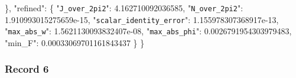 \documentclass[
  10pt,
]{article}
\newenvironment{Shaded}{}{}
\newcommand{\DataTypeTok}[1]{\textcolor[rgb]{0.56,0.13,0.00}{#1}}
\newcommand{\FloatTok}[1]{\textcolor[rgb]{0.25,0.63,0.44}{#1}}
\newcommand{\FunctionTok}[1]{\textcolor[rgb]{0.02,0.16,0.49}{#1}}
\begin{document}
\begin{Shaded}
\begin{Highlighting}[]
  \FunctionTok{\},}
  \DataTypeTok{"refined"}\FunctionTok{:} \FunctionTok{\{}
    \DataTypeTok{"\nolinkurl{J_over_2pi2}"}\FunctionTok{:} \FloatTok{4.162710092036585}\FunctionTok{,}
    \DataTypeTok{"\nolinkurl{N_over_2pi2}"}\FunctionTok{:} \FloatTok{1.910993015275659e{-}15}\FunctionTok{,}
    \DataTypeTok{"\nolinkurl{scalar_identity_error}"}\FunctionTok{:} \FloatTok{1.155978307368917e{-}13}\FunctionTok{,}
    \DataTypeTok{"\nolinkurl{max_abs_w}"}\FunctionTok{:} \FloatTok{1.5621130093832407e{-}08}\FunctionTok{,}
    \DataTypeTok{"\nolinkurl{max_abs_phi}"}\FunctionTok{:} \FloatTok{0.0026791954303979483}\FunctionTok{,}
    \DataTypeTok{"min\_F"}\FunctionTok{:} \FloatTok{0.00033069701161843437}
  \FunctionTok{\}}
\FunctionTok{\}}
\end{Highlighting}
\end{Shaded}

\hypertarget{record-6}{%
\subsubsection{Record 6}\label{record-6}}
\end{document}

